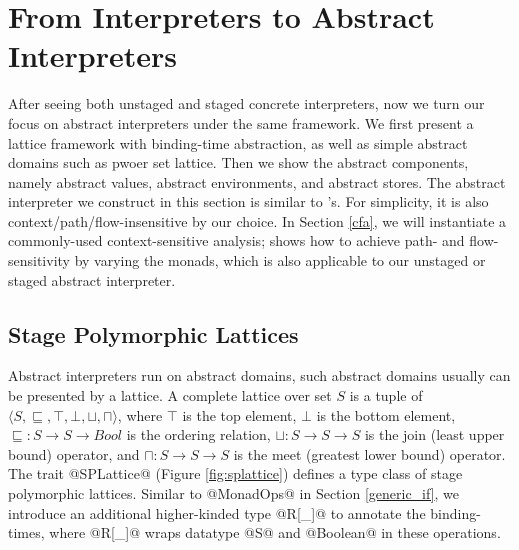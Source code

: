 \section{From Interpreters to Abstract Interpreters} \label{unstaged_abs}

After seeing both unstaged and staged concrete interpreters, now we turn our
focus on abstract interpreters under the same framework. We first present a
lattice framework with binding-time abstraction, as well as simple abstract
domains such as pwoer set lattice.
Then we show the abstract components, namely abstract values, abstract
environments, and abstract stores. The abstract interpreter we construct in this
section is similar to \citet{DBLP:journals/pacmpl/DaraisLNH17}'s. For
simplicity, it is also context/path/flow-insensitive by our choice. In Section
\ref{cfa}, we will instantiate a commonly-used context-sensitive analysis;
\citet{Darais:2015:GTM:2814270.2814308} shows how to achieve path- and
flow-sensitivity by varying the monads, which is also applicable to our unstaged
or staged abstract interpreter.

\subsection{Stage Polymorphic Lattices} \label{stagedpoly_lat}

Abstract interpreters run on abstract domains, such abstract domains usually can
be presented by a lattice.
A complete lattice over set $S$ is a tuple of $\langle S, \sqsubseteq, \top,
\bot, \sqcup, \sqcap \rangle$, where $\top$ is the top element, $\bot$ is the
bottom element, $\sqsubseteq : S \to S \to Bool$ is the
ordering relation, $\sqcup: S \to S \to S$ is the join (least upper bound)
operator, and $\sqcap: S \to S \to S$ is the meet (greatest lower bound)
operator. The trait @SPLattice@ (Figure \ref{fig:splattice}) defines a type
class of stage polymorphic lattices. Similar to @MonadOps@ in Section
\ref{generic_if}, we introduce an additional higher-kinded type @R[_]@ to
annotate the binding-times, where @R[_]@ wraps datatype @S@ and @Boolean@ in
these operations.

